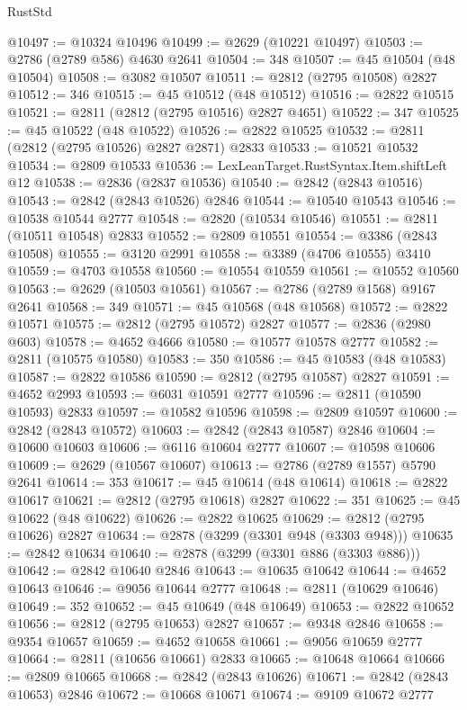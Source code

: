 \begin{lexlean}{RustStd}
\begin{coremodule}
@10497 := @10324 @10496
@10499 := @2629 (@10221 @10497)
@10503 := @2786 (@2789 @586) @4630 @2641
@10504 := 348
@10507 := @45 @10504 (@48 @10504)
@10508 := @3082 @10507
@10511 := @2812 (@2795 @10508) @2827
@10512 := 346
@10515 := @45 @10512 (@48 @10512)
@10516 := @2822 @10515
@10521 := @2811 (@2812 (@2795 @10516) @2827 @4651)
@10522 := 347
@10525 := @45 @10522 (@48 @10522)
@10526 := @2822 @10525
@10532 := @2811 (@2812 (@2795 @10526) @2827 @2871) @2833
@10533 := @10521 @10532
@10534 := @2809 @10533
@10536 := LexLeanTarget.RustSyntax.Item.shiftLeft @12
@10538 := @2836 (@2837 @10536)
@10540 := @2842 (@2843 @10516)
@10543 := @2842 (@2843 @10526) @2846
@10544 := @10540 @10543
@10546 := @10538 @10544 @2777
@10548 := @2820 (@10534 @10546)
@10551 := @2811 (@10511 @10548) @2833
@10552 := @2809 @10551
@10554 := @3386 (@2843 @10508)
@10555 := @3120 @2991
@10558 := @3389 (@4706 @10555) @3410
@10559 := @4703 @10558
@10560 := @10554 @10559
@10561 := @10552 @10560
@10563 := @2629 (@10503 @10561)
@10567 := @2786 (@2789 @1568) @9167 @2641
@10568 := 349
@10571 := @45 @10568 (@48 @10568)
@10572 := @2822 @10571
@10575 := @2812 (@2795 @10572) @2827
@10577 := @2836 (@2980 @603)
@10578 := @4652 @4666
@10580 := @10577 @10578 @2777
@10582 := @2811 (@10575 @10580)
@10583 := 350
@10586 := @45 @10583 (@48 @10583)
@10587 := @2822 @10586
@10590 := @2812 (@2795 @10587) @2827
@10591 := @4652 @2993
@10593 := @6031 @10591 @2777
@10596 := @2811 (@10590 @10593) @2833
@10597 := @10582 @10596
@10598 := @2809 @10597
@10600 := @2842 (@2843 @10572)
@10603 := @2842 (@2843 @10587) @2846
@10604 := @10600 @10603
@10606 := @6116 @10604 @2777
@10607 := @10598 @10606
@10609 := @2629 (@10567 @10607)
@10613 := @2786 (@2789 @1557) @5790 @2641
@10614 := 353
@10617 := @45 @10614 (@48 @10614)
@10618 := @2822 @10617
@10621 := @2812 (@2795 @10618) @2827
@10622 := 351
@10625 := @45 @10622 (@48 @10622)
@10626 := @2822 @10625
@10629 := @2812 (@2795 @10626) @2827
@10634 := @2878 (@3299 (@3301 @948 (@3303 @948)))
@10635 := @2842 @10634
@10640 := @2878 (@3299 (@3301 @886 (@3303 @886)))
@10642 := @2842 @10640 @2846
@10643 := @10635 @10642
@10644 := @4652 @10643
@10646 := @9056 @10644 @2777
@10648 := @2811 (@10629 @10646)
@10649 := 352
@10652 := @45 @10649 (@48 @10649)
@10653 := @2822 @10652
@10656 := @2812 (@2795 @10653) @2827
@10657 := @9348 @2846
@10658 := @9354 @10657
@10659 := @4652 @10658
@10661 := @9056 @10659 @2777
@10664 := @2811 (@10656 @10661) @2833
@10665 := @10648 @10664
@10666 := @2809 @10665
@10668 := @2842 (@2843 @10626)
@10671 := @2842 (@2843 @10653) @2846
@10672 := @10668 @10671
@10674 := @9109 @10672 @2777

\end{coremodule}
\end{lexlean}
